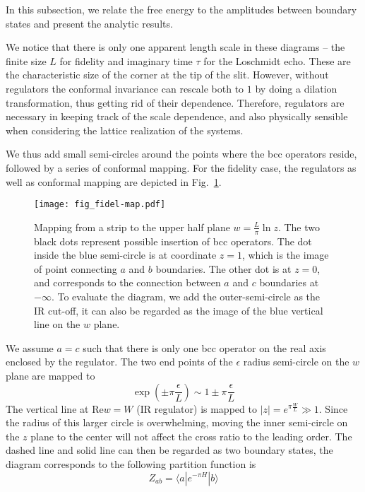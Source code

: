 
In this subsection, we relate the free energy to the amplitudes between boundary states and present the analytic results. 

We notice that there is only one apparent length scale in these diagrams -- the finite size $L$ for fidelity and imaginary time $\tau$ for the Loschmidt echo. These are the characteristic size of the corner at the tip of the slit. However, without regulators the conformal invariance can rescale both to $1$ by doing a dilation transformation, thus getting rid of their dependence. Therefore, regulators are necessary in keeping track of the scale dependence, and also physically sensible when considering the lattice realization of the systems. 

We thus add small semi-circles around the points where the bcc operators reside, followed by a series of conformal mapping. For the fidelity case, the regulators as well as conformal mapping are depicted in Fig.~\ref{fig:fidel-map}. 
\begin{figure}[h]
\centering
\texttt{[image: fig\_fidel-map.pdf]}
\caption{Mapping from a strip to the upper half plane $w = \frac{L}{\pi} \ln z $. The two black dots represent possible insertion of bcc operators. The dot inside the blue semi-circle is at coordinate $z = 1$, which is the image of point connecting $a$ and $b$ boundaries. The other dot is at $z = 0$, and corresponds to the connection between $a$ and $c$ boundaries at $- \infty$. To evaluate the diagram, we add the outer-semi-circle as the IR cut-off, it can also be regarded as the image of the blue vertical line on the $w$ plane.}
\label{fig:fidel-map}
\end{figure}
We assume $a = c$ such that there is only one bcc operator on the real axis enclosed by the regulator. The two end points of the $\epsilon$ radius semi-circle on the $w$ plane are mapped to
\begin{equation}
\exp( \pm \pi \frac{\epsilon}{ L}  ) \sim 1 \pm \pi \frac{\epsilon}{L} 
\end{equation}
The vertical line at $\text{Re} w = W$ (IR regulator) is mapped to $|z| = e^{\pi \frac{W}{L} } \gg 1 $. Since the radius of this larger circle is overwhelming, moving the inner semi-circle on the $z$ plane to the center will not affect the cross ratio to the leading order. The dashed line and solid line can then be regarded as two boundary states, the diagram corresponds to the following partition function is 
\begin{equation}
  Z_{ab} = \langle a | e^{-\pi H } |b \rangle 
\end{equation}



